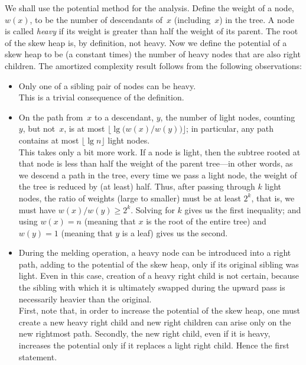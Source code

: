 \documentclass[11pt]{article}
\begin{document}
We shall use the potential method for the analysis.
Define the weight of a node, $w(x)$, to be the number of descendants of~$x$
(including~$x$) in the tree.  A node is called \emph{heavy} if its weight
is greater than half the weight of its parent.  The root of the skew heap is,
by definition, not heavy.  Now we define the potential of a skew heap to be
(a constant times) the number of heavy nodes that are also right children.
The amortized complexity result follows from the following observations:
  \begin{itemize}
    \itemsep 0pt
    \item
      Only one of a sibling pair of nodes can be heavy.\\
      This is a trivial consequence of the definition.
    \item
      On the path from~$x$ to a descendant, $y$, the number of light nodes,
      counting~$y$, but not~$x$, is at most
      $\bigl\lfloor \lg \bigl( w(x)/w(y) \bigr) \bigr\rfloor$;
      in particular, any path contains at most $\lfloor \lg n \rfloor$
      light nodes.\\
      This takes only a bit more work.  If a node is light, then the subtree
      rooted at that node is less than half the weight of the parent tree---in
      other words, as we descend a path in the tree, every time we pass
      a light node, the weight of the tree is reduced by (at least)
      half.  Thus, after passing through $k$ light nodes, the ratio of
      weights (large to smaller) must be at least $2^k$, that is, we must
      have $w(x)/w(y)\geq 2^k$.  Solving for $k$ gives us the first
      inequality; and using $w(x)=n$ (meaning that $x$ is the root of the
      entire tree) and $w(y)=1$ (meaning that $y$ is a leaf) gives us the
      second.
    \item
      During the melding operation, a heavy node can be introduced into
      a right path, adding to the potential of the skew heap,
      only if its original sibling was light.
      Even in this case, creation of a heavy right child is not
      certain, because the sibling with which it is ultimately swapped during
      the upward pass is necessarily heavier than the original.\\
      First, note that, in order to increase the potential of the skew
      heap, one must create a new heavy right child and new right
      children can arise only on the new rightmost path.  Secondly,
      the new right child, even if it is heavy, increases the potential
      only if it replaces a light right child.  Hence the first statement.

\end{itemize}
\end{document}
